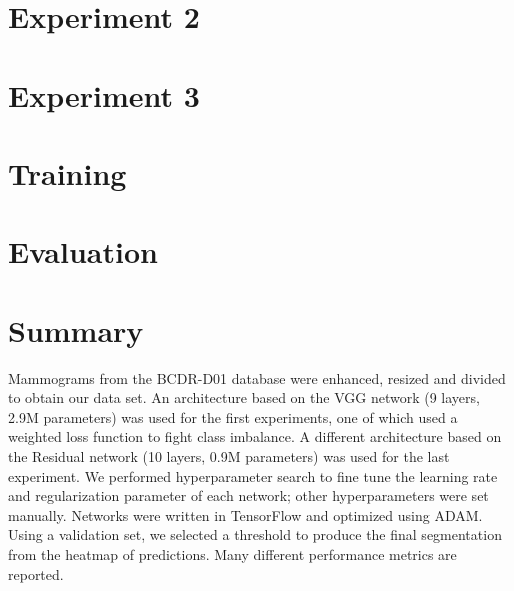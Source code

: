 \section{Experiment 2}
\label{sec:Experiment2}


\section{Experiment 3}
\label{sec:Experiment3}


\section{Training}


\section{Evaluation}


\section{Summary}
Mammograms from the BCDR-D01 database were enhanced, resized and divided to obtain our data set. An architecture based on the VGG network (9 layers, 2.9M parameters) was used for the first experiments, one of which used a weighted loss function to fight class imbalance. A different architecture based on the Residual network (10 layers, 0.9M parameters) was used for the last experiment. We performed hyperparameter search to fine tune the learning rate and regularization parameter of each network; other hyperparameters were set manually. Networks were written in TensorFlow and optimized using ADAM. Using a validation set, we selected a threshold to produce the final segmentation from the heatmap of predictions. Many different performance metrics are reported.
